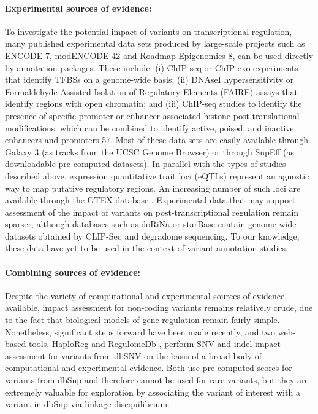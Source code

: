 \paragraph{Experimental sources of evidence:} To investigate the potential impact of variants on transcriptional regulation, many published experimental data sets produced by large-scale projects such as ENCODE 7, modENCODE 42 and Roadmap Epigenomics 8, can be used directly by annotation packages. These include: (i) ChIP-seq or ChIP-exo experiments that identify TFBSs on a genome-wide basis; (ii) DNAseI hypersensitivity or Formaldehyde-Assisted Isolation of Regulatory Elements (FAIRE) assays that identify regions with open chromatin; and (iii) ChIP-seq studies to identify the presence of specific promoter or enhancer-associated histone post-translational modifications, which can be combined to identify active, poised, and inactive enhancers and promoters 57. Most of these data sets are easily available through Galaxy 3 (as tracks from the UCSC Genome Browser) or through SnpEff (as downloadable pre-computed datasets). In parallel with the types of studies described above, expression quantitative trait loci (eQTLs) represent an agnostic way to map putative regulatory regions. An increasing number of such loci are available through the GTEX database  \cite{lonsdale2013genotype}. Experimental data that may support assessment of the impact of variants on post-transcriptional regulation remain sparser, although databases such as doRiNa  \cite{anders2011dorina} or starBase  \cite{yang2011starbase} contain genome-wide datasets obtained by CLIP-Seq and degradome sequencing. To our knowledge, these data have yet to be used in the context of variant annotation studies.

\paragraph{Combining sources of evidence:} Despite the variety of computational and experimental sources of evidence available, impact assessment for non-coding variants remains relatively crude, due to the fact that biological models of gene regulation remain fairly simple. Nonetheless, significant steps forward have been made recently, and two web-based tools, HaploReg  \cite{REF61} and RegulomeDb  \cite{REF62}, perform SNV and indel impact assessment for variants from dbSNV on the basis of a broad body of computational and experimental evidence. Both use pre-computed scores for variants from dbSnp and therefore cannot be used for rare variants, but they are extremely valuable for exploration by associating the variant of interest with a variant in dbSnp via linkage disequilibrium. 

